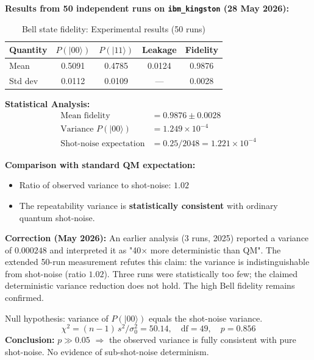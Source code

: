 \textbf{Results from 50 independent runs on \texttt{ibm\_kingston} (28 May 2026):}

\begin{table}[h]
	\centering
	\caption{Bell state fidelity: Experimental results (50 runs)}
	\label{tab:bell_fidelity}
	\begin{tabular}{@{}lcccc@{}}
		\toprule
		Quantity & $P(|00\rangle)$ & $P(|11\rangle)$ & Leakage & Fidelity \\
		\midrule
		Mean & 0.5091 & 0.4785 & 0.0124 & 0.9876 \\
		Std dev & 0.0112 & 0.0109 & --- & 0.0028 \\
		\bottomrule
	\end{tabular}
\end{table}

\textbf{Statistical Analysis:}
\begin{align}
	\text{Mean fidelity} &= 0.9876 \pm 0.0028 \\
	\text{Variance } P(|00\rangle) &= 1.249 \times 10^{-4} \\
	\text{Shot-noise expectation} &= 0.25/2048 = 1.221 \times 10^{-4}
\end{align}

\textbf{Comparison with standard QM expectation:}
\begin{itemize}
	\item Ratio of observed variance to shot-noise: $1.02$
	\item The repeatability variance is \textbf{statistically consistent} with ordinary quantum shot-noise.
\end{itemize}

\begin{important}
	\textbf{Correction (May 2026):} An earlier analysis (3 runs, 2025) reported a variance of $0.000248$ and interpreted it as "40× more deterministic than QM". The extended 50-run measurement refutes this claim: the variance is indistinguishable from shot-noise (ratio $1.02$). Three runs were statistically too few; the claimed deterministic variance reduction does not hold. The high Bell fidelity remains confirmed.
\end{important}

\begin{keyresult}
	Null hypothesis: variance of $P(|00\rangle)$ equals the shot-noise variance.
	\begin{equation}
		\chi^2 = (n-1)\,s^2/\sigma_0^2 = 50.14, \quad \mathrm{df}=49, \quad p = 0.856
	\end{equation}
	\textbf{Conclusion:} $p \gg 0.05$ $\Rightarrow$ the observed variance is fully consistent with pure shot-noise. No evidence of sub-shot-noise determinism.
\end{keyresult}

